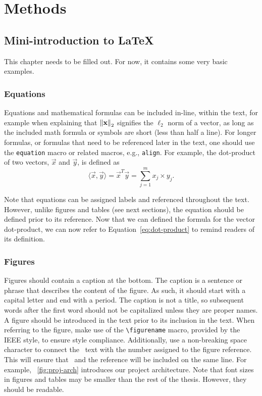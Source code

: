 \chapter{Methods}\label{ch:methods}

\section{Mini-introduction to LaTeX}\label{sec:latex}

This chapter needs to be filled out. For now, it contains some very basic examples.


\subsection{Equations}\label{sec:latex:equations}

Equations and mathematical formulas can be included in-line, within the text, for example when explaining that $\left\lVert\mathbf{x}\right\rVert_2$ signifies the $\ell_2$ norm of a vector, as long as the included math formula or symbols are short (less than half a line). For longer formulas, or formulas that need to be referenced later in the text, one should use the \texttt{equation} macro or related macros, e.g., \texttt{align}. For example, the dot-product of two vectors, $\vec x$ and $\vec y$, is defined as
\begin{equation}\label{eq:dot-product}
    \langle \vec x, \vec y \rangle = \vec{x}^T\vec{y} = \sum_{j=1}^m x_j\times y_j.
\end{equation}

Note that equations can be assigned labels and referenced throughout the text. However, unlike figures and tables (see next sections), the equation should be defined prior to its reference. Now that we can defined the formula for the vector dot-product, we can now refer to Equation~\ref{eq:dot-product} to remind readers of its definition.

\subsection{Figures}\label{sec:latex:figures}

Figures should contain a caption at the bottom. The caption is a sentence or phrase that describes the content of the figure. As such, it should start with a capital letter and end with a period. The caption is not a title, so subsequent words after the first word should not be capitalized unless they are proper names. A figure should be introduced in the text prior to its inclusion in the text. When referring to the figure, make use of the  \texttt{{\textbackslash}figurename} macro, provided by the IEEE style, to ensure style compliance. Additionally, use a non-breaking space character to connect the \figurename~text with the number assigned to the figure reference. This will ensure that \figurename~and the reference will be included on the same line. For example, \figurename~\ref{fig:proj-arch} introduces our project architecture. Note that font sizes in figures and tables may be smaller than the rest of the thesis. However, they should be readable.

